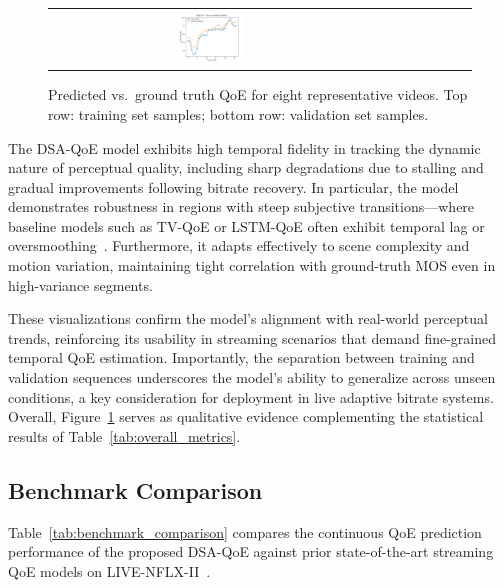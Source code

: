 \begin{figure}[h]
\begin{tabular}{@{}cccccccc@{}}
        \includegraphics[width=0.22\textwidth]{figures/validation/video_34_true_vs_predicted.png} \\
    \end{tabular}
    \caption{Predicted vs.~ground truth QoE for eight representative videos. Top row: training set samples; bottom row: validation set samples.}
    \label{fig:qoe_case_studies}
\end{figure}

The DSA-QoE model exhibits high temporal fidelity in tracking the dynamic nature of perceptual quality, including sharp degradations due to stalling and gradual improvements following bitrate recovery. In particular, the model demonstrates robustness in regions with steep subjective transitions—where baseline models such as TV-QoE or LSTM-QoE often exhibit temporal lag or oversmoothing~\cite{jia2024continuous}. Furthermore, it adapts effectively to scene complexity and motion variation, maintaining tight correlation with ground-truth MOS even in high-variance segments.

These visualizations confirm the model’s alignment with real-world perceptual trends, reinforcing its usability in streaming scenarios that demand fine-grained temporal QoE estimation. Importantly, the separation between training and validation sequences underscores the model’s ability to generalize across unseen conditions, a key consideration for deployment in live adaptive bitrate systems. Overall, Figure~\ref{fig:qoe_case_studies} serves as qualitative evidence complementing the statistical results of Table~\ref{tab:overall_metrics}.

\subsection{Benchmark Comparison}

Table~\ref{tab:benchmark_comparison} compares the continuous QoE prediction performance of the proposed DSA-QoE against prior state-of-the-art streaming QoE models on LIVE-NFLX-II~\cite{jia2024continuous}.


